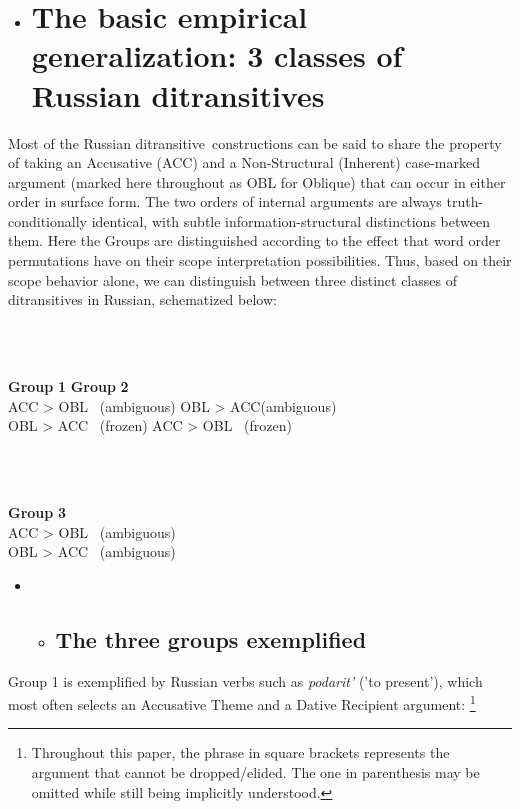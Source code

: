 \documentclass[output=paper,modfonts, nonflat]{langsci/langscibook}
\begin{document}
\begin{itemize}
\item \section{The basic empirical generalization: 3 classes of Russian ditransitives} 
\end{itemize}

Most of the Russian ditransitive~constructions can be said to share the property of taking an Accusative (ACC) and a Non-Structural (Inherent) case-marked argument (marked here throughout as OBL for Oblique) that can occur in either order in surface form. The two orders of internal arguments are always truth-conditionally identical, with subtle information-structural distinctions between them. Here the Groups are distinguished according to the effect that word order permutations have on their scope interpretation possibilities. Thus, based on their scope behavior alone, we can distinguish between three distinct classes of ditransitives in Russian, schematized below:

\ea%
    \label{ex:key:9}
    \gll\\
        \\
    \glt
    \z

          \textbf{Group} \textbf{1}        \textbf{Group} \textbf{2}\\
ACC > OBL ~(ambiguous)     OBL > ACC(ambiguous)\\
OBL > ACC ~(frozen)     ACC > OBL ~(frozen)

\ea%
    \label{ex:key:11}
    \gll\\
        \\
    \glt
    \z

          \textbf{Group} \textbf{3}\\
ACC > OBL ~(ambiguous)\\
OBL > ACC ~(ambiguous)

\begin{itemize}
\item \begin{itemize}
\item \subsection{The three groups exemplified}
\end{itemize}
\end{itemize}

Group 1 is exemplified by Russian verbs such as \textit{podarit’} ('to present’), which most often selects an Accusative Theme and a Dative Recipient argument: \footnote{Throughout this paper, the phrase in square brackets represents the argument that cannot be dropped/elided. The one in parenthesis may be omitted while still being implicitly understood.} 
\end{document}
